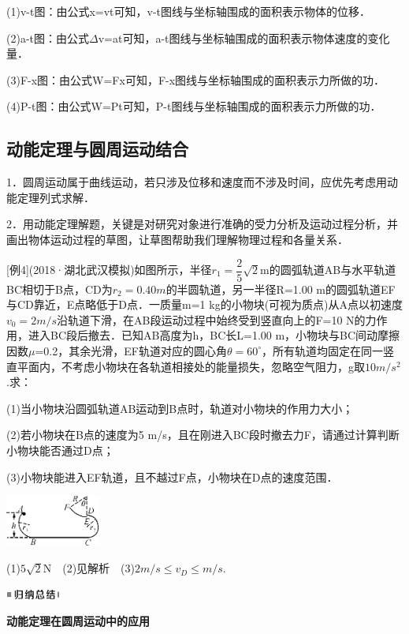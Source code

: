 (1)v-t图：由公式x=vt可知，v-t图线与坐标轴围成的面积表示物体的位移．

(2)a-t图：由公式$\Delta$v=at可知，a-t图线与坐标轴围成的面积表示物体速度的变化量．

(3)F-x图：由公式W=Fx可知，F-x图线与坐标轴围成的面积表示力所做的功．

(4)P-t图：由公式W=Pt可知，P-t图线与坐标轴围成的面积表示力所做的功．


\subsection{动能定理与圆周运动结合}

1．圆周运动属于曲线运动，若只涉及位移和速度而不涉及时间，应优先考虑用动能定理列式求解．

2．用动能定理解题，关键是对研究对象进行准确的受力分析及运动过程分析，并画出物体运动过程的草图，让草图帮助我们理解物理过程和各量关系．

{[}例4{]}(2018·湖北武汉模拟)如图所示，半径$r_{1}=\dfrac{2}{5} \sqrt{2} \mathrm{m}$的圆弧轨道AB与水平轨道BC相切于B点，CD为$r_2=0.40m$的半圆轨道，另一半径R=1.00
m的圆弧轨道EF与CD靠近，E点略低于D点．一质量m=1
kg的小物块(可视为质点)从A点以初速度$v_0=2m/s$沿轨道下滑，在AB段运动过程中始终受到竖直向上的F=10
N的力作用，进入BC段后撤去．已知AB高度为h，BC长L=1.00
m，小物块与BC间动摩擦因数$\mu$=0.2，其余光滑，EF轨道对应的圆心角$\theta=60^\circ$，所有轨道均固定在同一竖直平面内，不考虑小物块在各轨道相接处的能量损失，忽略空气阻力，g取$10m/s^2$.求：

(1)当小物块沿圆弧轨道AB运动到B点时，轨道对小物块的作用力大小；

(2)若小物块在B点的速度为5
m/s，且在刚进入BC段时撤去力F，请通过计算判断小物块能否通过D点；

(3)小物块能进入EF轨道，且不越过F点，小物块在D点的速度范围．

\begin{center}\includegraphics[width=1.21667in,height=0.66042in]{media/image226.png}\end{center}

\begin{solution}
	(1)$5 \sqrt{2} \mathrm{N}$　(2)见解析　(3)$2 m/s\leq v_D\leq  m/s$.
\end{solution}
\begin{center}\includegraphics[width=0.70764in,height=0.12292in]{media/image13.png}

\textbf{动能定理在圆周运动中的应用}
\end{center}


